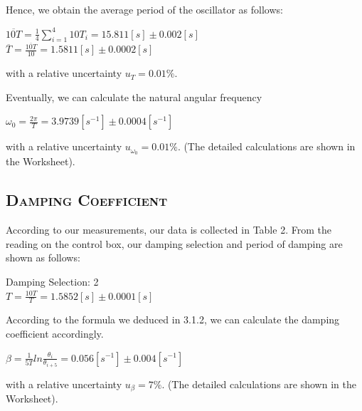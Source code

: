 \documentclass[a4paper,12pt]{article}
\begin{document}
Hence, we obtain the average period of the oscillator as follows:
\begin{center}
$\displaystyle \overline{10T} = \frac{1}{4}\sum_{i=1}^4 10T_i = 15.811 [s] \pm 0.002 [s]$ \\[3 mm]
$\displaystyle \overline{T} = \frac{\overline{10T}}{10} = 1.5811 [s] \pm 0.0002 [s]$
\end{center} 
with a relative uncertainty $\displaystyle u_T = 0.01 \%$.\\
\par 
Eventually, we can calculate the natural angular frequency 
\begin{center}
$\displaystyle \omega_0 = \frac{2\pi}{T} = 3.9739 [s^{-1}] \pm 0.0004[s^{-1}]$
\end{center}
with a relative uncertainty $\displaystyle u_{\omega_0} = 0.01 \%$. (The detailed calculations are shown in the Worksheet). 

\subsection{\textsc{Damping Coefficient}}
According to our measurements, our data is collected in Table 2.
From the reading on the control box, our damping selection and period of damping are shown as follows:

\begin{center}
Damping Selection: 2 \\[3 mm]
$\displaystyle T = \frac{10T}{T} = 1.5852 [s] \pm 0.0001 [s] $
\end{center}

According to the formula we deduced in 3.1.2, we can calculate the damping coefficient accordingly.
\begin{center}
$\displaystyle \beta = \frac{1}{5T}ln\frac{\theta_i}{\theta_{i+5}} = 0.056 [s^{-1}] \pm 0.004[s^{-1}]$
\end{center}
with a relative uncertainty $\displaystyle u_{\beta} = 7 \%$. (The detailed calculations are shown in the Worksheet). 
\end{document}
